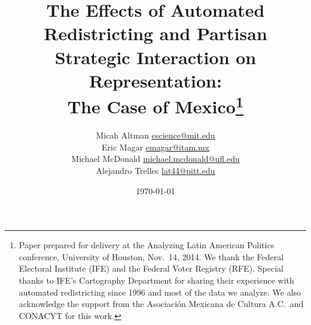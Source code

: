 \documentclass[letter,12pt]{article}
\begin{document}
\title{The Effects of Automated Redistricting and Partisan Strategic Interaction on Representation: \\ 
       The Case of Mexico\thanks{Paper prepared for delivery at the Analyzing Latin American Politics conference, University of Houston, Nov.~14, 2014. We thank the Federal Electoral Institute (IFE) and the Federal Voter Registry (RFE). Special thanks to IFE's Cartography Department for sharing their experience with automated redistricting since 1996 and most of the data we analyze. We also acknowledge the support from the Asociaci\'on Mexicana de Cultura A.C.\ and CONACYT for this work.}}
\author{Micah Altman {\small \url{escience@mit.edu}} \\
        Eric Magar {\small \url{emagar@itam.mx}} \\
        Michael McDonald {\small \url{michael.mcdonald@ufl.edu}} \\  %
        Alejandro Trelles {\small \url{lat44@pitt.edu}}
      }
\date{\today}
\maketitle
\end{document}
